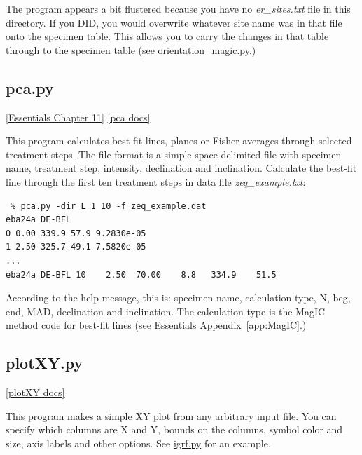 \documentclass[11pt]{book}
\begin{document}
{{The program appears a bit flustered because you have no {\it er\_sites.txt} file in this directory.  If you DID, you would overwrite whatever site name was in that file onto the specimen table.  This allows you to carry the changes in that table through to the specimen table (see \href{#orientation_magic.py}{orientation\_magic.py}.)


%
\subsection{pca.py}
\href{http://earthref.org/MAGIC/books/Tauxe/Essentials/WebBook3ch11.html#ch11}{[Essentials Chapter 11]}
\href{https://github.com/PmagPy/PmagPy/blob/master/programs/pca.py}{[pca docs]}

This program calculates best-fit lines, planes or Fisher averages through selected treatment steps.  The file format is
a simple space delimited file with specimen name, treatment step,  intensity, declination and inclination.  Calculate the best-fit
line through the first ten treatment steps in data file {\it zeq\_example.txt}:

 \begin{verbatim}
 % pca.py -dir L 1 10 -f zeq_example.dat
eba24a DE-BFL
0 0.00 339.9 57.9 9.2830e-05
1 2.50 325.7 49.1 7.5820e-05
...
eba24a DE-BFL 10    2.50  70.00    8.8   334.9    51.5
\end{verbatim}

 According to the help message, this is: specimen name, calculation type, N, beg, end, MAD, declination and inclination.   The calculation type is the MagIC method code for best-fit lines (see Essentials Appendix~\ref{app:MagIC}.)


%
%


  \subsection{plotXY.py}
  \href{https://github.com/PmagPy/PmagPy/blob/master/programs/plotXY.py}{[plotXY docs]}

This program makes a simple XY plot from any arbitrary input file.  You can specify which columns are X and Y, bounds on the columns, symbol color and size, axis labels and other options.  See \href{#igrf.py}{igrf.py} for an example.

}}
\end{document}
